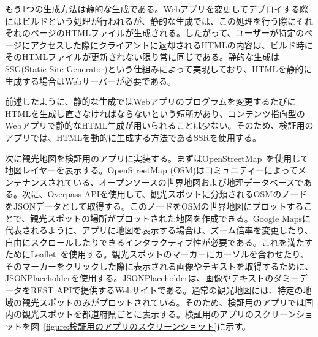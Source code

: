 もう1つの生成方法は静的な生成である。Webアプリを変更してデプロイする際にはビルドという処理が行われるが、静的な生成では、この処理を行う際にそれぞれのページのHTMLファイルが生成される。したがって、ユーザーが特定のページにアクセスした際にクライアントに返却されるHTMLの内容は、ビルド時にそのHTMLファイルが更新されない限り常に同じである。静的な生成はSSG(Static Site Generator)という仕組みによって実現しており、HTMLを静的に生成する場合はWebサーバーが必要である。

前述したように、静的な生成ではWebアプリのプログラムを変更するたびにHTMLを生成し直さなければならないという短所があり、コンテンツ指向型のWebアプリで静的なHTML生成が用いられることは少ない。そのため、検証用のアプリでは、HTMLを動的に生成する方法であるSSRを使用する。

次に観光地図を検証用のアプリに実装する。まずはOpenStreetMap~\cite{OpenStreetMap}を使用して地図レイヤーを表示する。OpenStreetMap (OSM)はコミュニティーによってメンテナンスされている、オープンソースの世界地図および地理データベースである。次に、Overpass APIを使用して、観光スポットに分類されるOSMのノードをJSONデータとして取得する。このノードをOSMの世界地図にプロットすることで、観光スポットの場所がプロットされた地図を作成できる。Google Mapsに代表されるように、アプリに地図を表示する場合は、ズーム倍率を変更したり、自由にスクロールしたりできるインタラクティブ性が必要である。これを満たすためにLeaflet~\cite{Leaflet}を使用する。観光スポットのマーカーにカーソルを合わせたり、そのマーカーをクリックした際に表示される画像やテキストを取得するために、JSONPlaceholderを使用する。JSONPlaceholderは、画像やテキストのダミーデータをREST APIで提供するWebサイトである。通常の観光地図には、特定の地域の観光スポットのみがプロットされている。そのため、検証用のアプリでは国内の観光スポットを都道府県ごとに表示する。検証用のアプリのスクリーンショットを図~\ref{figure:検証用のアプリのスクリーンショット}に示す。
